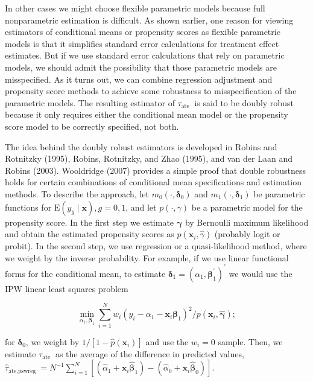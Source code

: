 \documentclass[10pt]{article}
\begin{document}
In other cases we might choose flexible parametric models because full nonparametric estimation is difficult. As shown earlier, one reason for viewing estimators of conditional means or propensity scores as flexible parametric models is that it simplifies standard error calculations for treatment effect estimates. But if we use standard error calculations that rely on parametric models, we should admit the possibility that those parametric models are misspecified. As it turns out, we can combine regression adjustment and propensity score methods to achieve some robustness to misspecification of the parametric models. The resulting estimator of $\tau_{\text {ate }}$ is said to be doubly robust because it only requires either the conditional mean model or the propensity score model to be correctly specified, not both.

The idea behind the doubly robust estimators is developed in Robins and Rotnitzky (1995), Robins, Rotnitzky, and Zhao (1995), and van der Laan and Robins (2003). Wooldridge (2007) provides a simple proof that double robustness holds for certain combinations of conditional mean specifications and estimation methods. To describe the approach, let $m_{0}\left(\cdot, \boldsymbol{\delta}_{0}\right)$ and $m_{1}\left(\cdot, \boldsymbol{\delta}_{1}\right)$ be parametric functions for $\mathrm{E}\left(y_{g} \mid \mathbf{x}\right), g=0,1$, and let $p(\cdot, \gamma)$ be a parametric model for the propensity score. In the first step we estimate $\boldsymbol{\gamma}$ by Bernoulli maximum likelihood and obtain the estimated propensity scores as $p\left(\mathbf{x}_{i}, \hat{\gamma}\right)$ (probably logit or probit). In the second step, we use regression or a quasi-likelihood method, where we weight by the inverse probability. For example, if we use linear functional forms for the conditional mean, to estimate $\boldsymbol{\delta}_{1}=\left(\alpha_{1}, \boldsymbol{\beta}_{1}^{\prime}\right)^{\prime}$ we would use the IPW linear least squares problem


\begin{equation*}
\min _{\alpha_{1}, \boldsymbol{\beta}_{1}} \sum_{i=1}^{N} w_{i}\left(y_{i}-\alpha_{1}-\mathbf{x}_{i} \boldsymbol{\beta}_{1}\right)^{2} / p\left(\mathbf{x}_{i}, \hat{\boldsymbol{\gamma}}\right) ; \tag{21.53}
\end{equation*}


for $\boldsymbol{\delta}_{0}$, we weight by $1 /\left[1-\hat{p}\left(\mathbf{x}_{i}\right)\right]$ and use the $w_{i}=0$ sample. Then, we estimate $\tau_{\text {ate }}$ as the average of the difference in predicted values,\\
$\hat{\tau}_{\text {ate,pswreg }}=N^{-1} \sum_{i=1}^{N}\left[\left(\hat{\alpha}_{1}+\mathbf{x}_{i} \hat{\boldsymbol{\beta}}_{1}\right)-\left(\hat{\alpha}_{0}+\mathbf{x}_{i} \hat{\boldsymbol{\beta}}_{0}\right)\right]$.
\end{document}
